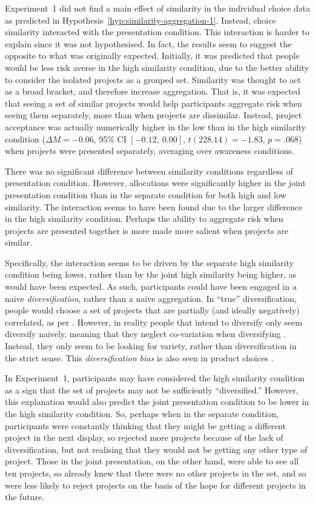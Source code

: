 \documentclass[a4paper, nobind]{templates/ociamthesis}
\theoremstyle{definition}
\theoremstyle{definition}
\theoremstyle{definition}
\theoremstyle{definition}
\theoremstyle{remark}
\begin{document}
Experiment~1 did not find a main effect of similarity in the individual choice
data as predicted in Hypothesis~\ref{hyp:similarity-aggregation-1}. Instead,
choice similarity interacted with the presentation condition. This interaction
is harder to explain since it was not hypothesised. In fact, the results seem to
suggest the opposite to what was originally expected. Initially, it was
predicted that people would be less risk averse in the high similarity
condition, due to the better ability to consider the isolated projects as a
grouped set. Similarity was thought to act as a broad bracket, and therefore
increase aggregation. That is, it was expected that seeing a set of similar
projects would help participants aggregate risk when seeing them separately,
more than when projects are dissimilar. Instead, project acceptance was actually
numerically higher in the low than in the high similarity condition
(\(\Delta M = -0.06\), 95\% CI \([-0.12,~0.00]\), \(t(228.14) = -1.83\), \(p = .068\)) when projects were
presented separately, averaging over awareness conditions.

There was no significant difference between similarity conditions regardless of
presentation condition. However, allocations were significantly higher in the
joint presentation condition than in the separate condition for both high and
low similarity. The interaction seems to have been found due to the larger
difference in the high similarity condition. Perhaps the ability to aggregate
risk when projects are presented together is more made more salient when
projects are similar.

Specifically, the interaction seems to be driven by the separate high similarity
condition being lower, rather than by the joint high similarity being higher, as
would have been expected. As such, participants could have been engaged in a
naive \emph{diversification}, rather than a naive aggregation. In ``true''
diversification, people would choose a set of projects that are partially (and
ideally negatively) correlated, as per \textcite{markowitz1952}. However, in reality
people that intend to diversify only seem diversify naively, meaning that they
neglect co-variation when diversifying \autocite[e.g.,][]{hedesstrom2006}. Instead, they
only seem to be looking for variety, rather than diversification in the strict
sense. This \emph{diversification bias} is also seen in product choices \autocite{read1995}.

In Experiment~1, participants may have considered the high similarity condition
as a sign that the set of projects may not be sufficiently ``diversified.''
However, this explanation would also predict the joint presentation condition to
be lower in the high similarity condition. So, perhaps when in the separate
condition, participants were constantly thinking that they might be getting a
different project in the next display, so rejected more projects because of the
lack of diversification, but not realising that they would not be getting any
other type of project. Those in the joint presentation, on the other hand, were
able to see all ten projects, so already knew that there were no other projects
in the set, and so were less likely to reject projects on the basis of the hope
for different projects in the future.
\end{document}
